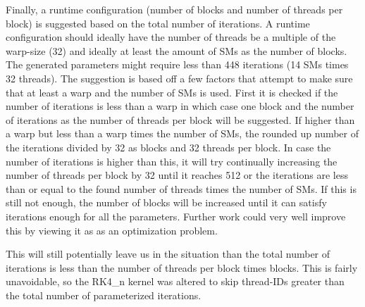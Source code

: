 Finally, a runtime configuration (number of blocks and number of threads per block) is suggested based on the total number of iterations.
A runtime configuration should ideally have the number of threads be a multiple of the warp-size (32) and ideally at least the amount of SMs as the number of blocks.
The generated parameters might require less than 448 iterations (14 SMs times 32 threads).
The suggestion is based off a few factors that attempt to make sure that at least a warp and the number of SMs is used.
First it is checked if the number of iterations is less than a warp in which case one block and the number of iterations as the number of threads per block will be suggested.
If higher than a warp but less than a warp times the number of SMs, the rounded up number of the iterations divided by 32 as blocks and 32 threads per block.
In case the number of iterations is higher than this, it will try continually increasing the number of threads per block by 32 until it reaches 512 or the iterations are less than or equal to the found number of threads times the number of SMs.
If this is still not enough, the number of blocks will be increased until it can satisfy iterations enough for all the parameters.
Further work could very well improve this by viewing it as as an optimization problem.

This will still potentially leave us in the situation than the total number of iterations is less than the number of threads per block times blocks.
This is fairly unavoidable, so the RK4\_n kernel was altered to skip thread-IDs greater than the total number of parameterized iterations.
